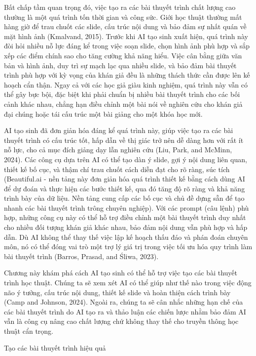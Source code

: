 Bất chấp tầm quan trọng đó, việc tạo ra các bài thuyết trình chất lượng cao thường là một quá trình tốn thời gian và công sức. Giới học thuật thường mất hàng giờ để trau chuốt các slide, cấu trúc nội dung và bảo đảm sự nhất quán về mặt hình ảnh (Kmalvand, 2015). Trước khi AI tạo sinh xuất hiện, quá trình này đòi hỏi nhiều nỗ lực đáng kể trong việc soạn slide, chọn hình ảnh phù hợp và sắp xếp các điểm chính sao cho tăng cường khả năng hiểu. Việc cân bằng giữa văn bản và hình ảnh, duy trì sự mạch lạc qua nhiều slide, và bảo đảm bài thuyết trình phù hợp với kỳ vọng của khán giả đều là những thách thức cần được lên kế hoạch cẩn thận. Ngay cả với các học giả giàu kinh nghiệm, quá trình này vẫn có thể gây bực bội, đặc biệt khi phải chuẩn bị nhiều bài thuyết trình cho các bối cảnh khác nhau, chẳng hạn điều chỉnh một bài nói về nghiên cứu cho khán giả đại chúng hoặc tái cấu trúc một bài giảng cho một khóa học mới.

AI tạo sinh đã đơn giản hóa đáng kể quá trình này, giúp việc tạo ra các bài thuyết trình có cấu trúc tốt, hấp dẫn về thị giác trở nên dễ dàng hơn với rất ít nỗ lực, cho cả mục đích giảng dạy lẫn nghiên cứu (Liu, Park, and McMinn, 2024). Các công cụ dựa trên AI có thể tạo dàn ý slide, gợi ý nội dung liên quan, thiết kế bố cục, và thậm chí trau chuốt cách diễn đạt cho rõ ràng, súc tích (Beautiful.ai - nền tảng này đơn giản hóa quá trình thiết kế bằng cách dùng AI để dự đoán và thực hiện các bước thiết kế, qua đó tăng độ rõ ràng và khả năng trình bày của dữ liệu. Nền tảng cung cấp các bố cục và chủ đề dựng sẵn để tạo nhanh các bài thuyết trình trông chuyên nghiệp). Với các prompt (câu lệnh) phù hợp, những công cụ này có thể hỗ trợ điều chỉnh một bài thuyết trình duy nhất cho nhiều đối tượng khán giả khác nhau, bảo đảm nội dung vẫn phù hợp và hấp dẫn. Dù AI không thể thay thế việc lập kế hoạch thấu đáo và phán đoán chuyên môn, nó có thể đóng vai trò một trợ lý giá trị trong việc tối ưu hóa quy trình làm bài thuyết trình (Barros, Prasad, and Śliwa, 2023).

Chương này khám phá cách AI tạo sinh có thể hỗ trợ việc tạo các bài thuyết trình học thuật. Chúng ta sẽ xem xét AI có thể giúp như thế nào trong việc động não ý tưởng, cấu trúc nội dung, thiết kế slide và hoàn thiện cách trình bày (Camp and Johnson, 2024). Ngoài ra, chúng ta sẽ cân nhắc những hạn chế của các bài thuyết trình do AI tạo ra và thảo luận các chiến lược nhằm bảo đảm AI vẫn là công cụ nâng cao chất lượng chứ không thay thế cho truyền thông học thuật cẩn trọng.

Tạo các bài thuyết trình hiệu quả

